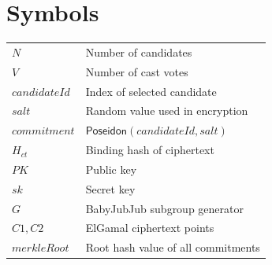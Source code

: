 \chapter*{Symbols}

\noindent
\begin{tabular}{ll}
$N$ & Number of candidates \\
$V$ & Number of cast votes \\
$\mathit{candidateId}$ & Index of selected candidate \\
$\mathit{salt}$ & Random value used in encryption \\
$\mathit{commitment}$ & $\mathsf{Poseidon}(\mathit{candidateId},\mathit{salt})$ \\
$H_{ct}$ & Binding hash of ciphertext \\
$\mathit{PK}$ & Public key \\
$\mathit{sk}$ & Secret key \\
$G$ & BabyJubJub subgroup generator \\
$C1, C2$ & ElGamal ciphertext points \\
$\mathit{merkleRoot}$ & Root hash value of all commitments \\
\end{tabular}

